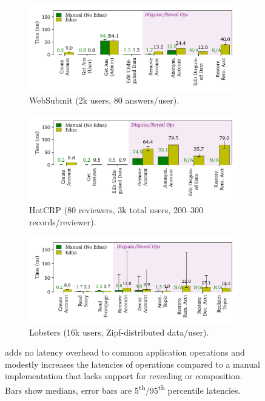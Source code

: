 \begin{figure}
\begin{subfigure}[b]{\columnwidth}
    \centering
  \includegraphics[width=.8\columnwidth]{figs/websubmit_op_stats}
\caption{WebSubmit (2k users, 80 answers/user).}
\label{f:ops-websubmit}
\end{subfigure}

    \vspace{12pt}
\begin{subfigure}[b]{\columnwidth}
    \centering
    \includegraphics[width=.8\columnwidth]{figs/hotcrp_op_stats}
  \caption{HotCRP (80 reviewers, 3k total users, 200--300 records/reviewer).}
\label{f:ops-hotcrp}
\end{subfigure}

    \vspace{12pt}
\begin{subfigure}[b]{\columnwidth}
    \centering
    \includegraphics[width=.8\columnwidth]{figs/lobsters_op_stats}
\caption{Lobsters (16k users, Zipf-distributed data/user).}
\label{f:ops-lobsters}
\end{subfigure}
    \caption[Latency of common application, disguising, and
    revealing operations with \sys.]{\sys adds no latency overhead to common application operations and
modestly increases the latencies of \xxing operations compared to a manual
implementation that lacks support for revealing or composition.
%
Bars show medians, error bars are 5\textsuperscript{th}/95\textsuperscript{th}
percentile latencies.}
\label{fig:client_opstats}
\end{figure}

